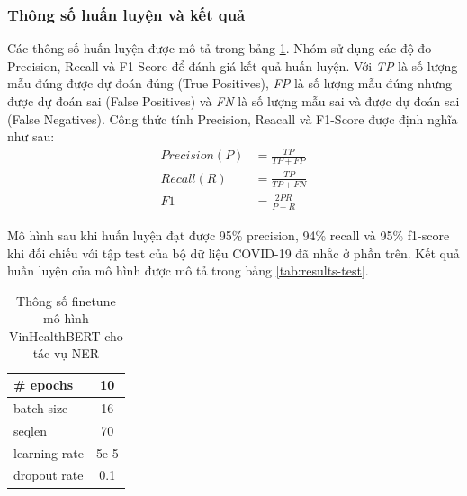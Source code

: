 \documentclass[12pt]{article}
\begin{document}
\subsubsection{Thông số huấn luyện và kết quả}
Các thông số huấn luyện được mô tả trong bảng \ref{tab:configurations}. Nhóm sử dụng các độ đo Precision, Recall và F1-Score để đánh giá kết quả huấn luyện. Với \textit{TP} là số lượng mẫu đúng được dự đoán đúng (True Positives), \textit{FP} là số lượng mẫu đúng nhưng được dự đoán sai (False Positives) và \textit{FN} là số lượng mẫu sai và được dự đoán sai (False Negatives). Công thức tính Precision, Reacall và F1-Score được định nghĩa như sau:
\begin{equation*}
\begin{aligned}
Precision (P) &= \frac{TP}{TP + FP} \\
Recall (R) &= \frac{TP}{TP + FN} \\
F1 &= \frac{2PR}{P + R}
\end{aligned}
\end{equation*}

Mô hình sau khi huấn luyện đạt được 95\% precision, 94\% recall và 95\% f1-score khi đối chiếu với tập test của bộ dữ liệu COVID-19 đã nhắc ở phần trên. Kết quả huấn luyện của mô hình được mô tả trong bảng \ref{tab:results-test}.
\begin{table}
\centering
\begin{tabular}{|l|c|}
\hline
\# epochs & 10 \\
\hline
batch size & 16 \\
\hline
seqlen & 70 \\
\hline
learning rate & 5e-5 \\
\hline
dropout rate & 0.1 \\
\hline
\end{tabular}
\caption{Thông số finetune mô hình VinHealthBERT cho tác vụ NER}
\label{tab:configurations}
\end{table}
\end{document}
